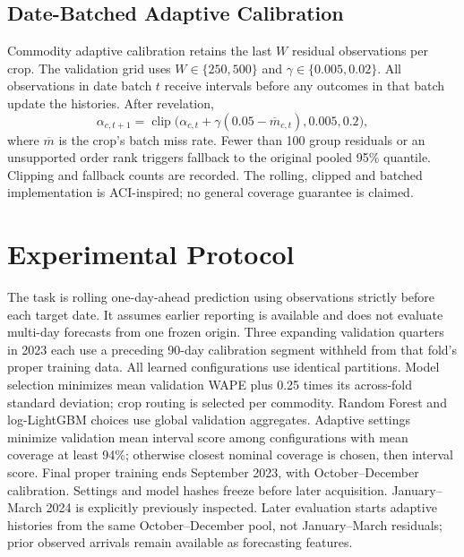 \documentclass[conference]{IEEEtran}
\begin{document}
\subsection{Date-Batched Adaptive Calibration}
Commodity adaptive calibration retains the last $W$ residual observations per crop. The validation grid uses $W\in\{250,500\}$ and $\gamma\in\{0.005,0.02\}$. All observations in date batch $t$ receive intervals before any outcomes in that batch update the histories. After revelation,
\begin{equation}\alpha_{c,t+1}=\operatorname{clip}\big(\alpha_{c,t}+\gamma(0.05-\overline m_{c,t}),0.005,0.2\big),\end{equation}
where $\overline m$ is the crop's batch miss rate. Fewer than 100 group residuals or an unsupported order rank triggers fallback to the original pooled 95\% quantile. Clipping and fallback counts are recorded. The rolling, clipped and batched implementation is ACI-inspired; no general coverage guarantee is claimed.
\section{Experimental Protocol}
The task is rolling one-day-ahead prediction using observations strictly before each target date. It assumes earlier reporting is available and does not evaluate multi-day forecasts from one frozen origin. Three expanding validation quarters in 2023 each use a preceding 90-day calibration segment withheld from that fold's proper training data. All learned configurations use identical partitions. Model selection minimizes mean validation WAPE plus 0.25 times its across-fold standard deviation; crop routing is selected per commodity. Random Forest and log-LightGBM choices use global validation aggregates.
Adaptive settings minimize validation mean interval score among configurations with mean coverage at least 94\%; otherwise closest nominal coverage is chosen, then interval score. Final proper training ends September 2023, with October--December calibration. Settings and model hashes freeze before later acquisition. January--March 2024 is explicitly previously inspected. Later evaluation starts adaptive histories from the same October--December pool, not January--March residuals; prior observed arrivals remain available as forecasting features.
\end{document}
